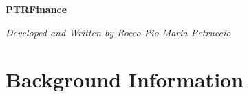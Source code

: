 \documentclass{article}
\begin{document}
	\begin{titlepage}
		\begin{center}
			\large
			\textbf{PTRFinance}
			
			\vspace{3cm}
			
			\normalsize
			\textit{Developed and Written by Rocco Pio Maria Petruccio}
		\end{center}
	\end{titlepage}
	
	\tableofcontents
	
	\newpage
	
	\section{Background Information}
		
	
\end{document}

